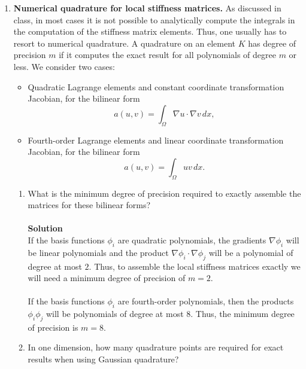 \documentclass[11pt]{article}
\begin{document}
\begin{enumerate}
\begin{enumerate}
 \end{enumerate}

\item {\bf Numerical quadrature for local stiffness matrices.} As
  discussed in class, in most cases it is not possible to analytically
  compute the integrals in the computation of the stiffness matrix
  elements. Thus, one usually has to resort to numerical quadrature. A quadrature
  on an element $K$ has degree of precision $m$ if it computes the
  exact result for all polynomials of degree $m$ or less.
  We consider two cases:
  \begin{itemize}
  \item Quadratic Lagrange elements and constant coordinate
    transformation Jacobian, for the bilinear form
    \begin{equation}\label{eq:K}
      a(u,v) = \int_\Omega\nabla u \cdot \nabla v\,dx,
    \end{equation}
  \item Fourth-order Lagrange elements and linear coordinate
    transformation Jacobian, for the bilinear form
    \begin{equation}\label{eqLM}
      a(u,v) = \int_\Omega u v\,dx.
    \end{equation}
  \end{itemize}
  \begin{enumerate}
  \item What is the minimum degree of precision required to exactly
    assemble the matrices for these bilinear forms?\\
\\

{\bf Solution}\\
If the basis functions $\phi_i$ are quadratic polynomials, the gradients $\nabla \phi_i$ will be linear polynomials and the product $\nabla \phi_i \cdot \nabla \phi_j$ will be a polynomial of degree at most $2$.  Thus, to assemble the local stiffness matrices exactly we will need a minimum degree of precision of $m = 2$.\\
\\
If the basis functions $\phi_i$ are fourth-order polynomials, then the products $\phi_i\phi_j$ will be polynomials of degree at most $8$.  Thus, the minimum degree of precision is $m = 8$.

  \item In one dimension, how many quadrature points are required for
    exact results when using Gaussian quadrature?\\
\\


\end{enumerate}
\end{enumerate}
\end{document}
